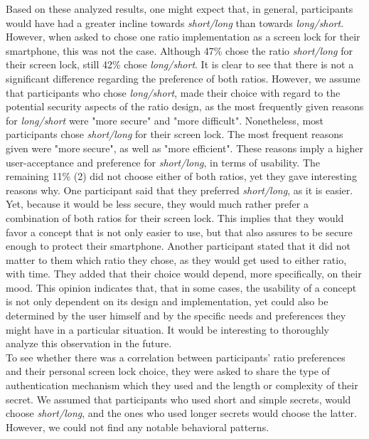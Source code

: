 Based on these analyzed results, one might expect that, in general,  participants would have had a greater incline towards \textit{short/long} than towards \textit{long/short}. However, when asked to chose one ratio implementation as a screen lock for their smartphone, this was not the case. Although 47\% chose the ratio \textit{short/long} for their screen lock, still 42\% chose \textit{long/short}. It is clear to see that there is not a significant difference regarding the preference of both ratios. However, we assume that participants who chose \textit{long/short}, made their choice with regard to the potential security aspects of the ratio design, as the most frequently given reasons for \textit{long/short} were "more secure" and "more difficult". Nonetheless, most participants chose \textit{short/long} for their screen lock. The most frequent reasons given were "more secure", as well as "more efficient". These reasons imply a higher user-acceptance and preference for \textit{short/long}, in terms of usability. The remaining 11\% (2) did not choose either of both ratios, yet they gave interesting reasons why. One participant said that they preferred \textit{short/long}, as it is easier. Yet, because it would be less secure, they would much rather prefer a combination of both ratios for their screen lock. This implies that they would favor a concept that is not only easier to use, but that also assures to be secure enough to protect their smartphone. Another participant stated that it did not matter to them which ratio they chose, as they would get used to either ratio, with time. They added that their choice would depend, more specifically, on their mood. This opinion indicates that, that in some cases, the usability of a concept is not only dependent on its design and implementation, yet could also be determined by the user himself and by the specific needs and preferences they might have in a particular situation. It would be interesting to thoroughly analyze this observation in the future.\\

To see whether there was a correlation between participants' ratio preferences and their personal screen lock choice, they were asked to share the type of authentication mechanism which they used and the length or complexity of their secret. We assumed that participants who used short and simple secrets, would choose \textit{short/long}, and the ones who used longer secrets would choose the latter. However, we could not find any notable behavioral patterns. \\

